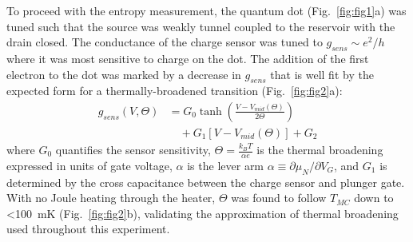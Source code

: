 \documentclass[twocolumn,showpacs,preprintnumbers,amsmath,amssymb,pra,aps,superscriptaddress]{revtex4-1}
\begin{document}
To proceed with the entropy measurement, the quantum dot (Fig.~\ref{fig:fig1}a) was tuned such that the source was weakly tunnel coupled to the reservoir with the drain closed.   The conductance of the charge sensor was tuned to $g_{sens}{\sim}e^2/h$ where it was most sensitive to charge on the dot.  The addition of the first electron to the dot was marked by a decrease in $g_{sens}$ that is well fit by the expected form for a thermally-broadened transition (Fig.~\ref{fig:fig2}a):
%
\begin{align}
\label{eqn:g}
        g_{sens}(V,\Theta) &= G_0 \tanh\left(\frac{V-V_{mid}(\Theta)}{2\Theta}\right)  \\
                        &\quad + G_1\left[V-V_{mid}(\Theta)\right] + G_2 \nonumber
\end{align}
%
where $G_0$ quantifies the sensor sensitivity, $\Theta = \frac{k_B T}{\alpha e}$ is the thermal broadening expressed in units of gate voltage, $\alpha$ is the lever arm $\alpha\equiv\partial \mu_{N}/\partial V_G$, and $G_1$ is determined by the cross capacitance between the charge sensor and plunger gate. With no Joule heating through the heater, $\Theta$ was found to follow $T_{MC}$ down to \SI{<100}{\milli\kelvin} (Fig.~\ref{fig:fig2}b), validating the approximation of thermal broadening used throughout this experiment.

\end{document}
